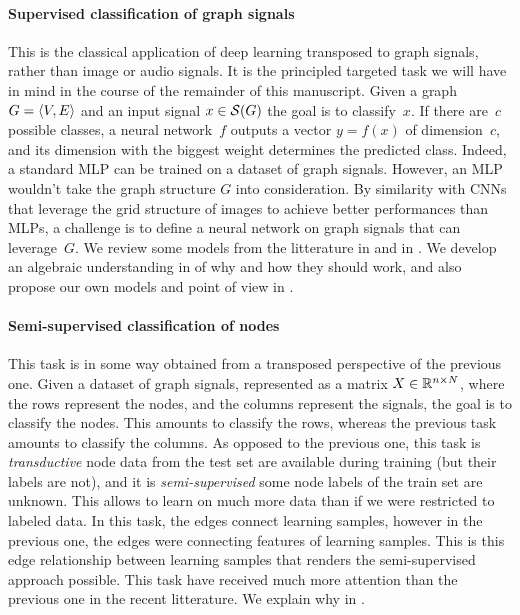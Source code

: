 \paragraph{Supervised classification of graph signals}
This is the classical application of deep learning transposed to graph signals, rather than image or audio signals. It is the principled targeted task we will have in mind in the course of the remainder of this manuscript. Given a graph $G = \langle V, E \rangle$ and an input signal $x \in \mathcal{S}(G)$ the goal is to classify~$x$. If there are~$c$ possible classes, a neural network~$f$ outputs a vector $y = f(x)$ of dimension~$c$, and its dimension with the biggest weight determines the predicted class. Indeed, a standard MLP can be trained on a dataset of graph signals. However, an MLP wouldn't take the graph structure $G$ into consideration. By similarity with CNNs that leverage the grid structure of images to achieve better performances than MLPs, a challenge is to define a neural network on graph signals that can leverage~$G$. We review some models from the litterature in  and in . We develop an algebraic understanding in  of why and how they should work, and also propose our own models and point of view in .

\paragraph{Semi-supervised classification of nodes}
This task is in some way obtained from a transposed perspective of the previous one. Given a dataset of graph signals, represented as a matrix $X \in \mathbb{R}^{n \times N}$, where the rows represent the nodes, and the columns represent the signals, the goal is to classify the nodes. This amounts to classify the rows, whereas the previous task amounts to classify the columns. As opposed to the previous one, this task is \emph{transductive} \ie node data from the test set are available during training (but their labels are not), and it is \emph{semi-supervised} \ie some node labels of the train set are unknown. This allows to learn on much more data than if we were restricted to labeled data. In this task, the edges connect learning samples, however in the previous one, the edges were connecting features of learning samples. This is this edge relationship between learning samples that renders the semi-supervised approach possible. This task have received much more attention than the previous one in the recent litterature. We explain why in .

